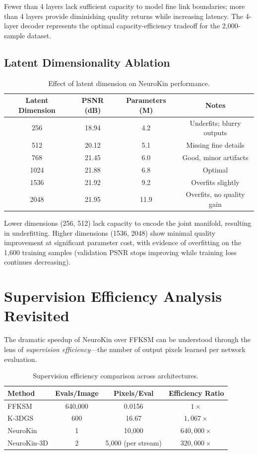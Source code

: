 ﻿\documentclass[12pt,a4paper,oneside]{report}
\begin{document}
Fewer than 4 layers lack sufficient capacity to model fine link boundaries; more than 4 layers provide diminishing quality returns while increasing latency. The 4-layer decoder represents the optimal capacity-efficiency tradeoff for the 2,000-sample dataset.

\subsection{Latent Dimensionality Ablation}

\begin{table}[H]
\centering
\caption{Effect of latent dimension on NeuroKin performance.}
\label{tab:latent_ablation}
\begin{tabular}{cccc}
\toprule
Latent Dimension & PSNR (dB) & Parameters (M) & Notes \\
\midrule
256 & 18.94 & 4.2 & Underfits; blurry outputs \\
512 & 20.12 & 5.1 & Missing fine details \\
768 & 21.45 & 6.0 & Good, minor artifacts \\
1024 & 21.88 & 6.8 & Optimal \\
1536 & 21.92 & 9.2 & Overfits slightly \\
2048 & 21.95 & 11.9 & Overfits, no quality gain \\
\bottomrule
\end{tabular}
\end{table}

Lower dimensions (256, 512) lack capacity to encode the joint manifold, resulting in underfitting. Higher dimensions (1536, 2048) show minimal quality improvement at significant parameter cost, with evidence of overfitting on the 1,600 training samples (validation PSNR stops improving while training loss continues decreasing).

\section{Supervision Efficiency Analysis Revisited}

The dramatic speedup of NeuroKin over FFKSM can be understood through the lens of \textit{supervision efficiency}---the number of output pixels learned per network evaluation.

\begin{table}[H]
\centering
\caption{Supervision efficiency comparison across architectures.}
\label{tab:supervision_efficiency}
\begin{tabular}{lccc}
\toprule
\textbf{Method} & \textbf{Evals/Image} & \textbf{Pixels/Eval} & \textbf{Efficiency Ratio} \\
\midrule
FFKSM & 640,000 & 0.0156 & $1\times$ \\
K-3DGS & 600 & 16.67 & $1,067\times$ \\
NeuroKin & 1 & 10,000 & $640,000\times$ \\
NeuroKin-3D & 2 & 5,000 (per stream) & $320,000\times$ \\
\bottomrule
\end{tabular}
\end{table}
\end{document}
